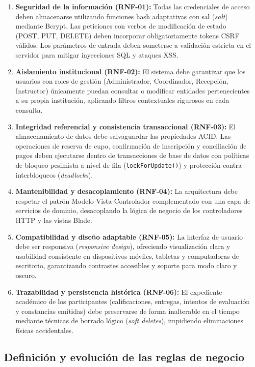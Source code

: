 \begin{enumerate}
    \item \textbf{Seguridad de la información (RNF-01):} Todas las credenciales de acceso deben almacenarse utilizando funciones hash adaptativas con sal (\textit{salt}) mediante Bcrypt. Las peticiones con verbos de modificación de estado (POST, PUT, DELETE) deben incorporar obligatoriamente tokens CSRF válidos. Los parámetros de entrada deben someterse a validación estricta en el servidor para mitigar inyecciones SQL y ataques XSS.
    \item \textbf{Aislamiento institucional (RNF-02):} El sistema debe garantizar que los usuarios con roles de gestión (Administrador, Coordinador, Recepción, Instructor) únicamente puedan consultar o modificar entidades pertenecientes a su propia institución, aplicando filtros contextuales rigurosos en cada consulta.
    \item \textbf{Integridad referencial y consistencia transaccional (RNF-03):} El almacenamiento de datos debe salvaguardar las propiedades ACID. Las operaciones de reserva de cupo, confirmación de inscripción y conciliación de pagos deben ejecutarse dentro de transacciones de base de datos con políticas de bloqueo pesimista a nivel de fila (\texttt{lockForUpdate()}) y protección contra interbloqueos (\textit{deadlocks}).
    \item \textbf{Mantenibilidad y desacoplamiento (RNF-04):} La arquitectura debe respetar el patrón Modelo-Vista-Controlador complementado con una capa de servicios de dominio, desacoplando la lógica de negocio de los controladores HTTP y las vistas Blade.
    \item \textbf{Compatibilidad y diseño adaptable (RNF-05):} La interfaz de usuario debe ser responsiva (\textit{responsive design}), ofreciendo visualización clara y usabilidad consistente en dispositivos móviles, tabletas y computadoras de escritorio, garantizando contrastes accesibles y soporte para modo claro y oscuro.
    \item \textbf{Trazabilidad y persistencia histórica (RNF-06):} El expediente académico de los participantes (calificaciones, entregas, intentos de evaluación y constancias emitidas) debe preservarse de forma inalterable en el tiempo mediante técnicas de borrado lógico (\textit{soft deletes}), impidiendo eliminaciones físicas accidentales.
\end{enumerate}

\subsection{Definición y evolución de las reglas de negocio}
\label{sec:evolucion_reglas}

